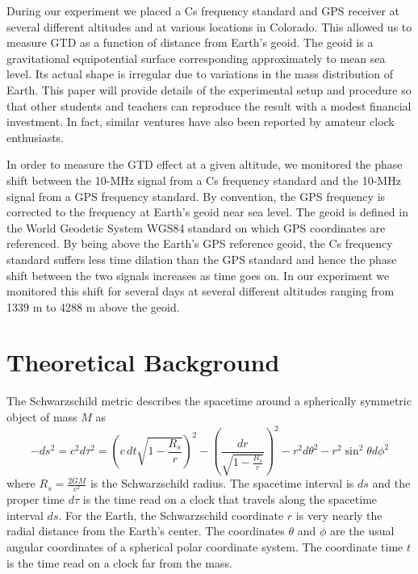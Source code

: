 \documentclass[prb,preprint]{revtex4-1}
\begin{document}
During our experiment we placed a Cs frequency standard and GPS receiver at several different altitudes and at various locations in Colorado. This allowed us to measure GTD as a function of distance from Earth's geoid. The geoid is a gravitational equipotential surface corresponding approximately to mean sea level. Its actual shape is irregular due to variations in the mass distribution of Earth.\cite{fowler}  This paper will provide details of the experimental setup and procedure so that other students and teachers can reproduce the result with a modest financial investment. In fact, similar ventures have also been reported by amateur clock enthusiasts.\cite{vanbaak2007} 

In order to measure the GTD effect at a given altitude, we monitored the phase shift between the 10-MHz signal from a Cs frequency standard and the 10-MHz signal from a GPS frequency standard. By convention, the GPS frequency is corrected to the frequency at Earth's geoid near sea level\cite{ashby2003}. The geoid is defined in the World Geodetic System WGS84 standard\cite{ngawebsite} on which GPS coordinates are referenced. By being above the Earth's GPS reference geoid, the Cs frequency standard suffers less time dilation than the GPS standard and hence the phase shift between the two signals increases as time goes on. In our experiment we monitored this shift for several days at several different altitudes ranging from 1339 m to 4288 m above the geoid. 

\section{Theoretical Background}
\label{sec:theory}
The Schwarzschild metric\cite{hartel} describes the spacetime around a spherically symmetric object of mass $M$ as
\begin{equation}
\label{eq:schwarzschild}
-ds^2 = c^2 d\tau ^2 = \left(c\, dt \sqrt{1-\frac{R_s}{r}}\right)^2 - \left(\frac{dr}{\sqrt{1-\frac{R_s}{r}}}\right)^2 - r^2 d\theta^2 - r^2 \sin^2\theta d\phi^2
\end{equation}
where $R_s = \frac{2GM}{c^2}$ is the Schwarzschild radius. The spacetime interval is $ds$ and the proper time $d\tau$ is the time read on a clock that travels along the spacetime interval $ds$. For the Earth, the Schwarzschild coordinate $r$ is very nearly the radial distance from the Earth's center.\cite{radial} The coordinates $\theta$ and $\phi$ are the usual angular coordinates of a spherical polar coordinate system. The coordinate time $t$ is the time read on a clock far from the mass.
\end{document}
